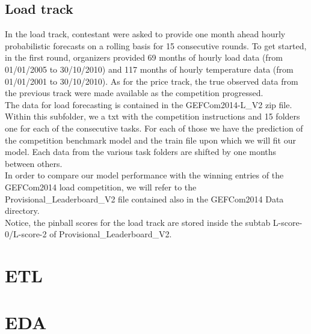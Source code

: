 \subsection{Load track}
In the load track, contestant were asked to provide one month ahead hourly probabilistic forecasts on a rolling basis for 15 consecutive rounds. To get started, in the first round, organizers provided 69 months of hourly load data (from 01/01/2005 to 30/10/2010) and 117 months of hourly temperature data (from 01/01/2001 to 30/10/2010). 
As for the price track, the true observed data from the previous track were made available as the competition progressed.
\\
The data for load forecasting is contained in the GEFCom2014-L\_V2 zip file. Within this subfolder, we a txt with the competition instructions and 15 folders one for each of the consecutive tasks. For each of those we have the prediction of the competition benchmark model and the train file upon which we will fit our model.
Each data from the various task folders are shifted by one months between others.
\\
In order to compare our model performance with the winning entries of the GEFCom2014 load competition, we will refer to the Provisional\_Leaderboard\_V2 file contained also in the GEFCom2014 Data directory.
\\
Notice, the pinball scores for the load track are stored inside the subtab L-score-0/L-score-2 of Provisional\_Leaderboard\_V2.

\section{ETL}


\section{EDA}